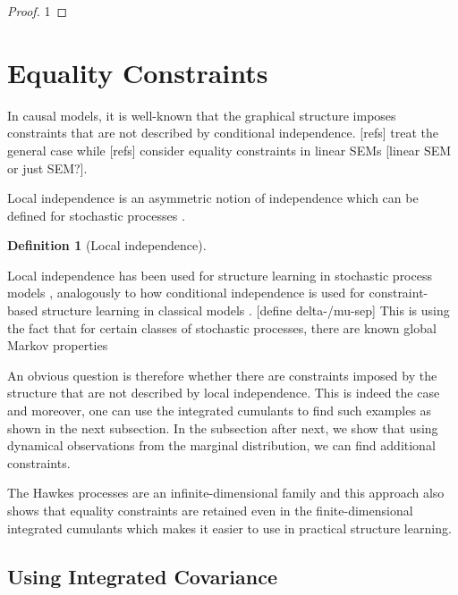 \documentclass[accepted]{uai2021} %
\newtheorem{defn}[thm]{Definition}
\begin{document}
\begin{proof}
	1
\end{proof}


\section{Equality Constraints}


In causal models, it is well-known that the graphical structure imposes 
constraints that 
are not described by conditional independence. [refs] treat the general case 
while [refs] consider equality constraints in linear SEMs [linear SEM or just 
SEM?]. 

Local independence is an asymmetric notion of independence which can be defined 
for stochastic processes \citep{schweder1970, aalen1987, didelez2000, 
didelez2008}.

\begin{defn}[Local independence]
	\label{def:li}
\end{defn}

Local independence has been used for structure learning in stochastic process 
models 
\citep{meek2014, mogensenUAI2018, thams2019, mogensenUAI2020}, analogously to 
how conditional independence is used for 
constraint-based structure learning in classical models \citep{spirtes1993, 
spirtesSearchChapHandbook}. 
[define 
delta-/mu-sep] This is using the fact that for certain classes of stochastic 
processes, there are known global Markov properties

An obvious question is therefore whether there are constraints imposed by the 
 structure that are not described by local independence. This is indeed the 
 case 
 and moreover, one can use the integrated cumulants to find such examples as 
 shown in the next subsection. In the subsection after next, we show that using 
 dynamical observations from the marginal distribution, we can find additional 
 constraints.

The Hawkes processes are an infinite-dimensional family and this approach also 
shows that equality constraints are retained even in the finite-dimensional 
integrated cumulants which makes it easier to use in practical structure 
learning.

\subsection{Using Integrated Covariance}
\end{document}
